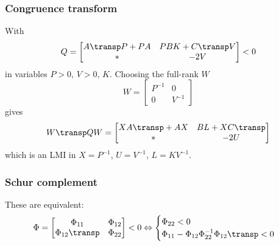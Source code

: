 \subsubsection{Congruence transform}
With
\begin{equation}
    Q =
    \begin{bmatrix}
        A\transp P + PA & PBK + C\transp V \\
        * & -2V
    \end{bmatrix}
    < 0
\end{equation}
in variables $P>0$, $V>0$, $K$. Choosing the full-rank $W$
\begin{equation}
    W =
    \begin{bmatrix}
        P^{-1} & 0 \\
        0 & V^{-1}
    \end{bmatrix}
\end{equation}
gives
\begin{equation}
    W\transp Q W =
    \begin{bmatrix}
        XA\transp + AX & BL + XC\transp \\
        * & -2U
    \end{bmatrix}
\end{equation}
which is an LMI in $X = P^{-1}$, $U = V^{-1}$, $L = KV^{-1}$.

\subsubsection{Schur complement}
These are equivalent:
\begin{equation}
    \Phi =
    \begin{bmatrix}
        \Phi_{11} & \Phi_{12} \\
        \Phi_{12}\transp & \Phi_{22}
    \end{bmatrix}
    < 0
    \Leftrightarrow
    \begin{cases}
        \Phi_{22} < 0 \\
        \Phi_{11} - \Phi_{12} \Phi_{22}^{-1} \Phi_{12}\transp < 0
    \end{cases}
\end{equation}

